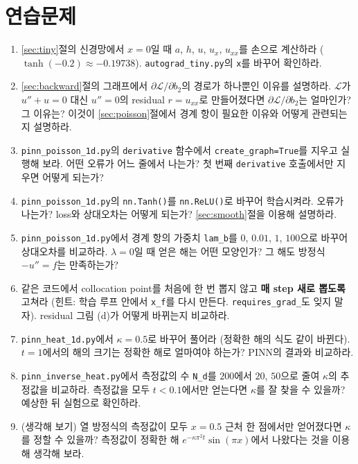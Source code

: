 \documentclass[11pt,a4paper]{article}
\newcommand{\loss}{\mathcal{L}}
\begin{document}
\section{연습문제}

\begin{enumerate}[label=\arabic*.]

\item \ref{sec:tiny}절의 신경망에서 $x=0$일 때 $a$, $h$, $u$, $u_x$, $u_{xx}$를 손으로 계산하라 ($\tanh(-0.2)\approx-0.19738$).
\texttt{autograd\_tiny.py}의 \texttt{x}를 바꾸어 확인하라.

\item \ref{sec:backward}절의 그래프에서 $\partial\loss/\partial b_2$의 경로가 하나뿐인 이유를 설명하라.
$\loss$가 $u''+u=0$ 대신 $u''=0$의 residual $r=u_{xx}$로 만들어졌다면 $\partial\loss/\partial b_2$는 얼마인가? 그 이유는?
이것이 \ref{sec:poisson}절에서 경계 항이 필요한 이유와 어떻게 관련되는지 설명하라.

\item \texttt{pinn\_poisson\_1d.py}의 \texttt{derivative} 함수에서 \texttt{create\_graph=True}를 지우고 실행해 보라.
어떤 오류가 어느 줄에서 나는가? 첫 번째 \texttt{derivative} 호출에서만 지우면 어떻게 되는가?

\item \texttt{pinn\_poisson\_1d.py}의 \texttt{nn.Tanh()}를 \texttt{nn.ReLU()}로 바꾸어 학습시켜라.
오류가 나는가? loss와 상대오차는 어떻게 되는가? \ref{sec:smooth}절을 이용해 설명하라.

\item \texttt{pinn\_poisson\_1d.py}에서 경계 항의 가중치 \texttt{lam\_b}를 $0$, $0.01$, $1$, $100$으로 바꾸어 상대오차를 비교하라.
$\lambda=0$일 때 얻은 해는 어떤 모양인가? 그 해도 방정식 $-u''=f$는 만족하는가?

\item 같은 코드에서 collocation point를 처음에 한 번 뽑지 않고 \textbf{매 step 새로 뽑도록} 고쳐라
(힌트: 학습 루프 안에서 \texttt{x\_f}를 다시 만든다. \texttt{requires\_grad\_}도 잊지 말자).
residual 그림 (d)가 어떻게 바뀌는지 비교하라.

\item \texttt{pinn\_heat\_1d.py}에서 $\kappa=0.5$로 바꾸어 풀어라 (정확한 해의 식도 같이 바뀐다).
$t=1$에서의 해의 크기는 정확한 해로 얼마여야 하는가? PINN의 결과와 비교하라.

\item \texttt{pinn\_inverse\_heat.py}에서 측정값의 수 \texttt{N\_d}를 $200$에서 $20$, $50$으로 줄여 $\kappa$의 추정값을 비교하라.
측정값을 모두 $t<0.1$에서만 얻는다면 $\kappa$를 잘 찾을 수 있을까? 예상한 뒤 실험으로 확인하라.

\item (생각해 보기) 열 방정식의 측정값이 모두 $x=0.5$ 근처 한 점에서만 얻어졌다면 $\kappa$를 정할 수 있을까?
측정값이 정확한 해 $e^{-\kappa\pi^2t}\sin(\pi x)$에서 나왔다는 것을 이용해 생각해 보라.

\end{enumerate}
\end{document}
